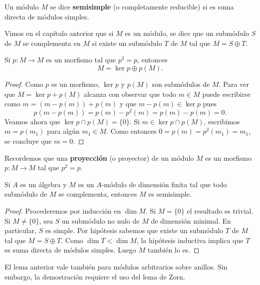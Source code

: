 \begin{definition}
Un módulo $M$ se dice \textbf{semisimple} (o completamente reducible) 
si es suma directa de módulos simples.
\end{definition}

Vimos en el capítulo anterior que si $M$ es un módulo, se dice que un submódulo $S$ de $M$ se complementa en $M$ si existe un submódulo $T$ de $M$ tal que $M=S\oplus T$.

\begin{lemma}
Si $p\colon M\to M$ es un morfismo tal que $p^2=p$, entonces 
\[
M=\ker p\oplus p(M).
\]
\end{lemma}

\begin{proof}
	Como $p$ es un morfismo, $\ker p$ y $p(M)$ son submódulos de $M$. 
	Para ver que $M=\ker p+p(M)$ alcanza con observar que todo $m\in M$ puede escribirse como
	$m=(m-p(m))+p(m)$ 
	y que $m-p(m)\in\ker p$ pues 
	\[
	p(m-p(m))=p(m)-p^2(m)=p(m)-p(m)=0. 
	\]
	Veamos ahora que $\ker p\cap p(M)=\{0\}$. Si $m\in\ker p\cap p(M)$, escribimos $m=p(m_1)$ para algún $m_1\in M$. Como entonces 
	$0=p(m)=p^2(m_1)=m_1$, se concluye que $m=0$.   
\end{proof}

Recordemos que 
una \textbf{proyección} (o proyector) de un módulo $M$ es un   
morfismo $p\colon M\to M$ tal que $p^2=p$. 
 
\begin{lemma}
Si $A$ es un álgebra y $M$ es un $A$-módulo de dimensión finita tal que
todo submódulo de $M$ se complementa, entonces $M$ es semisimple.
\end{lemma}

\begin{proof}
Procederemos por inducción en $\dim M$. Si $M=\{0\}$ el resultado es trivial. Si $M\ne\{0\}$, 
sea $S$ un submódulo no nulo de $M$ de dimensión minimal. En particular, $S$ es simple. Por hipótesis sabemos que existe un submódulo $T$ de $M$ tal que $M=S\oplus T$. Como $\dim T<\dim M$, la hipótesis inductiva implica que $T$ es suma directa de módulos simples. Luego $M$ también lo es. 
\end{proof}

El lema anterior vale también para módulos arbitrarios sobre anillos. Sin embargo, la demostración 
requiere el uso del lema de Zorn.

